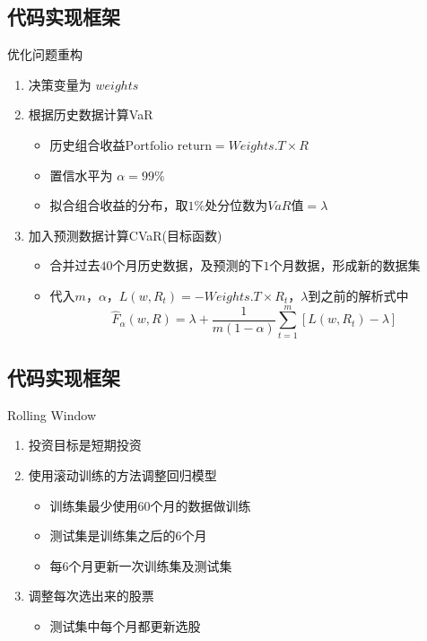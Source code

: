 \documentclass[CJK,aspectratio=43]{beamer}  %
\begin{document}
\subsection{代码实现框架}
\begin{frame}{优化问题重构}
	\begin{enumerate}
		\item 决策变量为 $weights$
		\item 根据历史数据计算VaR
		\begin{itemize}
			\item 历史组合收益$ \text{Portfolio return} = Weights.T \times R $
			\item 置信水平为 $\alpha=99\%$
			\item 拟合组合收益的分布，取$1\%$处分位数为$VaR$值$=\lambda$
		\end{itemize}
		\item 加入预测数据计算CVaR(目标函数)
		\begin{itemize}
			\item 合并过去$40$个月历史数据，及预测的下$1$个月数据，形成新的数据集
			\item 代入$m$，$\alpha$，$L(w,R_t)=-Weights.T \times R_t$，$\lambda$到之前的解析式中
			$$
			\widehat{F}_{\alpha}(w,R)=\lambda+\frac{1}{m(1-\alpha)}\sum_{t=1}^{m}[L(w,R_t)-\lambda]
			$$
		\end{itemize}
	\end{enumerate}
\end{frame}

\subsection{代码实现框架}
\begin{frame}{Rolling Window}
	\begin{enumerate}
		\item 投资目标是短期投资
		\item 使用滚动训练的方法调整回归模型
		\begin{itemize}
			\item 训练集最少使用60个月的数据做训练
			\item 测试集是训练集之后的6个月
			\item 每6个月更新一次训练集及测试集
		\end{itemize}
		\item 调整每次选出来的股票
		\begin{itemize}
			\item 测试集中每个月都更新选股
		\end{itemize}
	\end{enumerate}
\end{frame}
\end{document}
